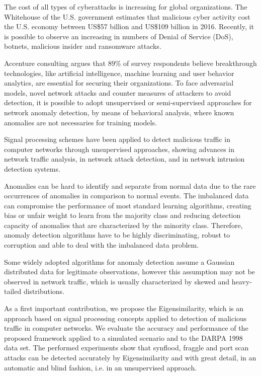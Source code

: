 The cost of all types of cyberattacks is increasing for global organizations. The Whitehouse of the U.S. government estimates that malicious cyber activity cost the U.S. economy between US\$57 billion and US\$109 billion in 2016. Recently, it is possible to observe an increasing in numbers of Denial of Service (DoS), botnets, malicious insider and ransomware attacks.

Accenture consulting argues that 89\% of survey respondents believe breakthrough technologies, like artificial intelligence, machine learning and user behavior analytics, are essential for securing their organizations. To face adversarial models, novel network attacks and counter measures of attackers to avoid detection, it is possible to adopt unsupervised or semi-supervised approaches for network anomaly detection, by means of behavioral analysis, where known anomalies are not necessaries for training models.

Signal processing schemes have been applied to detect malicious traffic in computer networks through unsupervised approaches, showing advances in network traffic analysis, in network attack detection, and in network intrusion detection systems. 

Anomalies can be hard to identify and separate from normal data due to the rare occurrences of anomalies in comparison to normal events. The imbalanced data can compromise the performance of most standard learning algorithms, creating bias or unfair weight to learn from the majority class and reducing detection capacity of anomalies that are characterized by the minority class. Therefore, anomaly detection algorithms have to be highly discriminating, robust to corruption and able to deal with the imbalanced data problem.

Some widely adopted algorithms for anomaly detection assume a Gaussian distributed data for legitimate observations, however this assumption may not be observed in network traffic, which is usually characterized by skewed and heavy-tailed distributions.

As a first important contribution, we propose the Eigensimilarity, which is an approach based on signal processing concepts applied to detection of malicious traffic in computer networks. We evaluate the accuracy and performance of the proposed framework applied to a simulated scenario and to the DARPA 1998 data set. The performed experiments show that synflood, fraggle and port scan attacks can be detected accurately by Eigensimilarity and with great detail, in an automatic and blind fashion, i.e. in an unsupervised approach.

